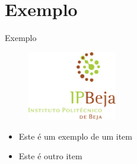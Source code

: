 \section{Exemplo}
\begin{frame}{Exemplo}
    \begin{figure}
        \centering
        \includegraphics[height=3cm]{resources/ipbeja_logo.png}
    \end{figure}
    \begin{itemize}
        \item Este é um exemplo de um item
        \item Este é outro item \cite{IEEEexample}
    \end{itemize}
\end{frame}
